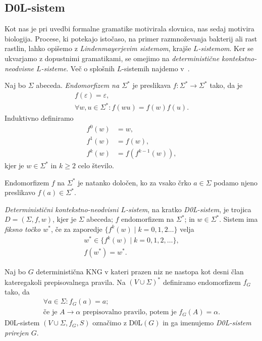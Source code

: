 \documentclass[fin1, tisk]{fmfdelo}
\theoremstyle{definition}
\begin{document}
\subsection{D0L-sistem}

Kot nas je pri uvedbi formalne gramatike motivirala slovnica, nas sedaj motivira biologija.
Procese, ki potekajo istočaso, na primer razmnoževanja bakterij ali rast rastlin, lahko opišemo z
\emph{Lindenmayerjevim sistemom}, krajše \emph{$L$-sistemom}. Ker se ukvarjamo z dopustnimi
gramatikami, se omejimo na \emph{deterministične kontekstno-neodvisne $L$-sisteme}. Več o splošnih
$L$-sistemih najdemo v~\cite{RozenbergSalomaa2012}.

\begin{definicija}
    Naj bo $\Sigma$ abeceda. \emph{Endomorfizem na $\Sigma^*$} je preslikava 
    $f \colon \Sigma^* \to \Sigma^* $ tako, da je
    \begin{gather*}
        f(\varepsilon) = \varepsilon, \\
        \forall w, u \in \Sigma^* \colon f(wu) = f(w)f(u).
    \end{gather*}
    Induktivno definiramo
    \begin{align*}
        f^0(w) &= w, \\
        f^1(w) &= f(w), \\
        f^k(w) &= f(f^{k-1}(w)),
    \end{align*}
    kjer je $w \in \Sigma^*$ in $k \geq 2$ celo število.
\end{definicija}

\begin{opomba}
    Endomorfizem $f$ na $\Sigma^*$ je natanko določen, ko za vsako črko $a \in \Sigma$ podamo 
    njeno preslikavo $f(a) \in \Sigma^*$.
\end{opomba}

\begin{definicija}
    \emph{Deterministični kontekstno-neodvisni $L$-sistem}, na kratko \emph{D0L-sistem},
    je trojica $D = (\Sigma, f, w)$, kjer je $\Sigma$ abeceda; $f$ endomorfizem na $\Sigma^*$;
    in $w \in \Sigma^*$. Sistem ima \emph{fiksno točko $ w^* $}, če za zaporedje 
    $\{ f^k(w) \mid k = 0, 1,2 \ldots \}$ velja
    \begin{gather*}
        w^* \in \{ f^k(w) \mid k = 0, 1, 2, \ldots \}, \\
        f(w^*)= w^*.
    \end{gather*}
\end{definicija}

\begin{definicija}
    Naj bo $G$ deterministična KNG v kateri prazen niz ne nastopa kot desni član kateregakoli 
    prepisovalnega pravila. Na $(V \cup \Sigma)^*$ definiramo endomorfizem $f_G$ tako, da
    \begin{gather*}
        \forall a \in \Sigma \colon f_G(a) = a; \\
        \text{če je } A \rightarrow \alpha \text{ prepisovalno pravilo, potem je } f_G(A) = \alpha.
    \end{gather*}
    D$0$L-sistem $(V \cup \Sigma, f_G, S)$ označimo z D$0$L$(G)$ in ga imenujemo 
    \emph{D0L-sistem prirejen $G$}.
\end{definicija}
\end{document}
